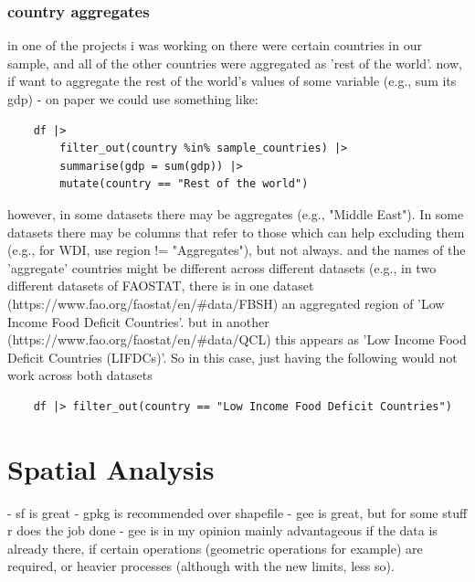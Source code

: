 \subsubsection{country aggregates}
in one of the projects i was working on there were certain countries in our sample, and all of the other countries were aggregated as 'rest of the world'. now, if want to aggregate the rest of the world's values of some variable (e.g., sum its gdp) - on paper we could use something like:
\begin{verbatim}
    df |> 
        filter_out(country %in% sample_countries) |>
        summarise(gdp = sum(gdp)) |> 
        mutate(country == "Rest of the world")
\end{verbatim}
however, in some datasets there may be aggregates (e.g., "Middle East"). In some datasets there may be columns that refer to those which can help excluding them (e.g., for WDI, use region != "Aggregates"), but not always. and the names of the 'aggregate' countries might be different across different datasets (e.g., in two different datasets of FAOSTAT, there is in one dataset (https://www.fao.org/faostat/en/#data/FBSH) an aggregated region of 'Low Income Food Deficit Countries'.
but in another (https://www.fao.org/faostat/en/#data/QCL) this appears as 'Low Income Food Deficit Countries (LIFDCs)'. So in this case, just having the following would not work across both datasets 
\begin{verbatim}
    df |> filter_out(country == "Low Income Food Deficit Countries") 
\end{verbatim}

\section{Spatial Analysis}

- sf is great
- gpkg is recommended over shapefile 
- gee is great, but for some stuff r does the job done - gee is in my opinion mainly advantageous if the data is already there, if certain operations (geometric operations for example) are required, or heavier processes (although with the new limits, less so). 

